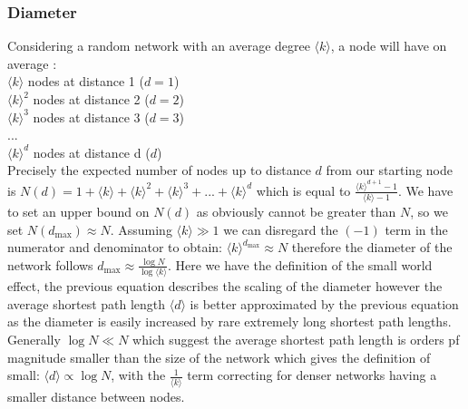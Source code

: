 \documentclass{article}
\begin{document}
            \subsubsection{Diameter}
            Considering a random network with an average degree $\langle k \rangle$, a node will have on average \parencite{barabasi2013network}:\\
            $\langle k \rangle$ nodes at distance 1 ($d=1$)\\
            $\langle k \rangle^2$ nodes at distance 2 ($d=2$)\\
            $\langle k \rangle^3$ nodes at distance 3 ($d=3$)\\
            ...\\
            $\langle k \rangle^d$ nodes at distance d ($d$)\\
            Precisely the expected number of nodes up to distance $d$ from our starting node is $N(d) = 1+\langle k \rangle+\langle k \rangle^2+\langle k \rangle^3+...+\langle k \rangle^d$ which is equal to $\frac{\langle k \rangle^{d+1}-1}{\langle k \rangle -1}$. We have to set an upper bound on $N(d)$ as obviously cannot be greater than $N$, so we set $N(d_{\text{max}}) \approx N$. Assuming $\langle k \rangle \gg 1$ we can disregard the $(-1)$ term in the numerator and denominator to obtain: $\langle k \rangle^{d_{\text{max}}} \approx N$ therefore the diameter of the network follows $d_{\text{max}} \approx \frac{\log{N}}{\log{\langle k \rangle}}$. Here we have the definition of the small world effect, the previous equation describes the scaling of the diameter however the average shortest path length $\langle d \rangle$ is better approximated by the previous equation as the diameter is easily increased by rare extremely long shortest path lengths. Generally $\log{N} \ll N$ which suggest the average shortest path length is orders pf magnitude smaller than the size of the network which gives the definition of small: $\langle d \rangle \propto \log{N}$, with the $\frac{1}{\langle k \rangle}$ term correcting for denser networks having a smaller distance between nodes.
\end{document}
